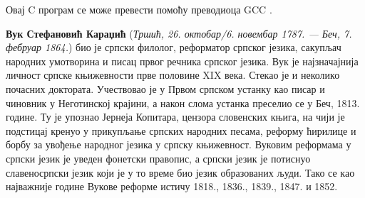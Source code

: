 \documentclass[12pt,oneside]{memoir}
\begin{document}
Овај C програм се може превести помоћу преводиоца GCC \cite{gcc}.




\literatura

\backmatter

\begin{biografija}
\textbf{Вук Стефановић Караџић} (\emph{Тршић, 26. октобар/6. новембар
  1787. — Беч, 7. фебруар 1864.}) био је српски филолог, реформатор
српског језика, сакупљач народних умотворина и писац првог речника
српског језика.  Вук је најзначајнија личност српске књижевности прве
половине XIX века. Стекао је и неколико почасних доктората.
Учествовао је у Првом српском устанку као писар и чиновник у
Неготинској крајини, а након слома устанка преселио се у Беч,
1813. године. Ту је упознао Јернеја Копитара, цензора словенских
књига, на чији је подстицај кренуо у прикупљање српских народних
песама, реформу ћирилице и борбу за увођење народног језика у српску
књижевност. Вуковим реформама у српски језик је уведен фонетски
правопис, а српски језик је потиснуо славеносрпски језик који је у то
време био језик образованих људи. Тако се као најважније године Вукове
реформе истичу 1818., 1836., 1839., 1847. и 1852.
\end{biografija}
\end{document}
